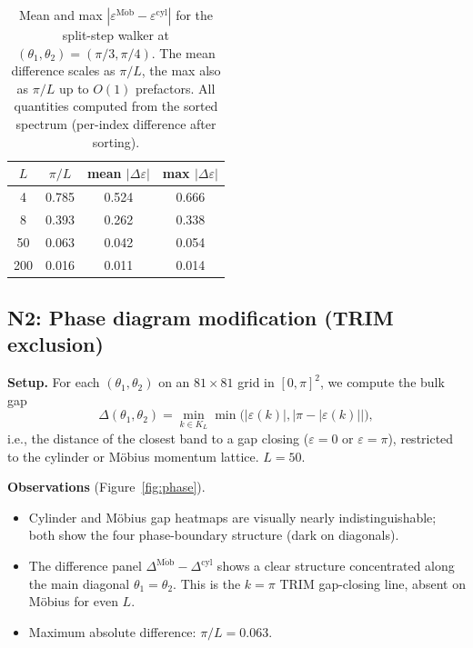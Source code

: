 \documentclass[aps,pra,reprint,amsmath,amssymb,superscriptaddress,nofootinbib,longbibliography]{revtex4-2}
\newcommand{\Mob}{\mathrm{M\ddot{o}b}}
\newcommand{\cyl}{\mathrm{cyl}}
\begin{document}
\begin{table}[t]
\caption{Mean and max $|\varepsilon^\Mob - \varepsilon^\cyl|$ for the split-step walker at $(\theta_1, \theta_2) = (\pi/3, \pi/4)$. The mean difference scales as $\pi/L$, the max also as $\pi/L$ up to $O(1)$ prefactors. All quantities computed from the sorted spectrum (per-index difference after sorting).}
\label{tab:spectrum_scale}
\begin{ruledtabular}
\begin{tabular}{cccc}
$L$ & $\pi/L$ & mean $|\Delta\varepsilon|$ & max $|\Delta\varepsilon|$ \\
\hline
4 & 0.785 & 0.524 & 0.666 \\
8 & 0.393 & 0.262 & 0.338 \\
50 & 0.063 & 0.042 & 0.054 \\
200 & 0.016 & 0.011 & 0.014 \\
\end{tabular}
\end{ruledtabular}
\end{table}

\subsection{N2: Phase diagram modification (TRIM exclusion)}

\textbf{Setup.} For each $(\theta_1, \theta_2)$ on an $81 \times 81$ grid in $[0, \pi]^2$, we compute the bulk gap
\begin{equation}
\Delta(\theta_1, \theta_2) = \min_{k \in K_L} \min\big(|\varepsilon(k)|, |\pi - |\varepsilon(k)||\big),
\end{equation}
i.e., the distance of the closest band to a gap closing ($\varepsilon = 0$ or $\varepsilon = \pi$), restricted to the cylinder or M\"obius momentum lattice. $L = 50$.

\textbf{Observations} (Figure~\ref{fig:phase}).
\begin{itemize}
\item Cylinder and M\"obius gap heatmaps are visually nearly indistinguishable; both show the four phase-boundary structure (dark on diagonals).
\item The difference panel $\Delta^\Mob - \Delta^\cyl$ shows a clear structure concentrated along the main diagonal $\theta_1 = \theta_2$. This is the $k = \pi$ TRIM gap-closing line, absent on M\"obius for even $L$.
\item Maximum absolute difference: $\pi/L = 0.063$.
\end{itemize}
\end{document}
